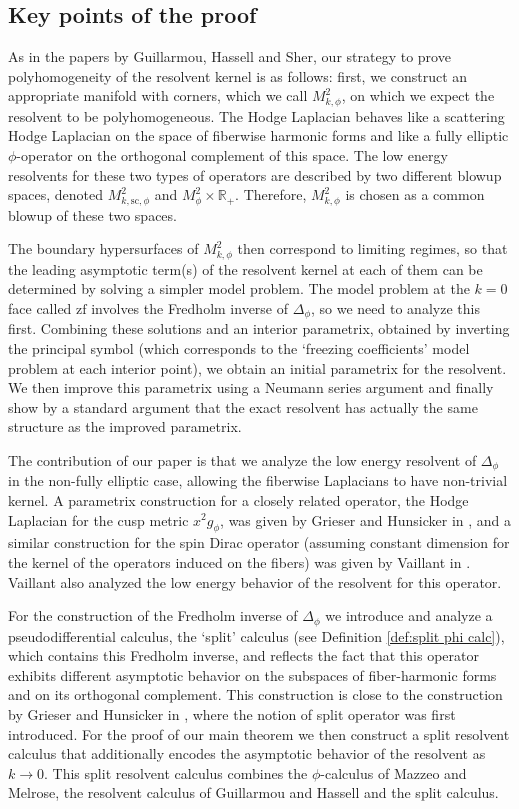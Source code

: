 \documentclass[JEP,XML,SOM,Unicode,NoFloatCountersInSection,published]{cedram}
\theoremstyle{plain}
\theoremstyle{definition}
\newcommand{\R}{{\mathbb{R}}}
\newcommand{\ssc}{{\mathrm{sc}}}
\newcommand{\zf}{{\mathrm{zf}}}
\begin{document}
\subsection{Key points of the proof}
As in the papers by Guillarmou, Hassell and Sher, our strategy to prove polyhomogeneity of the resolvent kernel is as follows: first, we construct an appropriate manifold with corners, which we call $M^2_{k,\phi}$, on which we expect the resolvent to be polyhomogeneous. The Hodge Laplacian behaves like a scattering Hodge Laplacian on the space of fiberwise harmonic forms and like a fully elliptic $\phi$-operator on the orthogonal complement of this space. The low energy resolvents for these two types of operators are described by two different blowup spaces, denoted $M^2_{k,\ssc,\phi}$ and $M^2_\phi\times\R_+$. Therefore, $M^2_{k,\phi}$ is chosen as a common blowup of these two spaces.

The boundary hypersurfaces of $M^2_{k,\phi}$ then correspond to limiting regimes, so that the leading asymptotic term(s) of the resolvent kernel at each of them can be determined by solving a simpler model problem. The model problem at the $k=0$ face called $\zf$ involves the Fredholm inverse of $\Delta_\phi$, so we need to analyze this first.
Combining these solutions and an interior parametrix, obtained by inverting the principal symbol (which corresponds to the `freezing coefficients' model problem at each interior point), we obtain an initial parametrix for the resolvent. We then improve this parametrix using a Neumann series argument and finally show by a standard argument that the exact resolvent has actually the same structure as the improved parametrix.

The contribution of our paper is that we analyze the low energy resolvent of $\Delta_{\phi}$ in the non-fully elliptic case, \ie allowing the fiberwise Laplacians to have non-trivial kernel. A parametrix construction for a closely related operator, the Hodge Laplacian for the cusp metric $x^2g_\phi$, was given by Grieser and Hunsicker in \cite{grieser-para}, and a similar construction for the spin Dirac operator (assuming constant dimension for the kernel of the operators induced on the fibers) was given by Vaillant in \cite{vaillant}. Vaillant also analyzed the low energy behavior of the resolvent for this operator.

For the construction of the Fredholm inverse of $\Delta_\phi$ we introduce and analyze a pseudodifferential calculus, the `split' calculus (see Definition \ref{def:split phi calc}), which contains this Fredholm inverse, and reflects the fact that this operator exhibits different asymptotic behavior on the subspaces of fiber-harmonic forms and on its orthogonal complement. This construction is close to the construction by Grieser and Hunsicker in \cite{grieser-para}, where the notion of split operator was first introduced.
For the proof of our main theorem we then construct a split resolvent calculus that additionally encodes the asymptotic behavior of the resolvent as $k\to0$. This split resolvent calculus combines the $\phi$-calculus of Mazzeo and Melrose, the resolvent calculus of Guillarmou and Hassell and the
split calculus.
\end{document}
